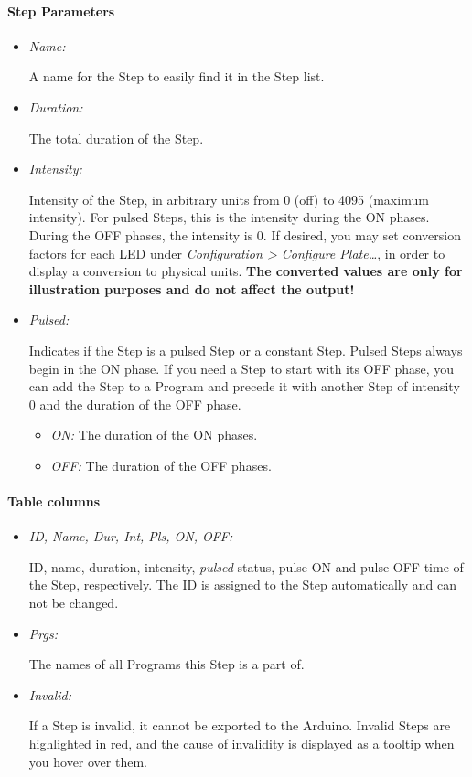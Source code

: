 \hypertarget{step-parameters}{%
\paragraph{Step Parameters}\label{step-parameters}}

\begin{itemize}
\item
  \emph{Name:}

  A name for the Step to easily find it in the Step list.
\item
  \emph{Duration:}

  The total duration of the Step.
\item
  \emph{Intensity:}

  Intensity of the Step, in arbitrary units from 0 (off) to 4095
  (maximum intensity). For pulsed Steps, this is the intensity during
  the ON phases. During the OFF phases, the intensity is 0. If desired,
  you may set conversion factors for each LED under \emph{Configuration
  \textgreater{} Configure Plate\ldots{}}, in order to display a
  conversion to physical units. \textbf{The converted values are only
  for illustration purposes and do not affect the output!}
\item
  \emph{Pulsed:}

  Indicates if the Step is a pulsed Step or a constant Step. Pulsed
  Steps always begin in the ON phase. If you need a Step to start with
  its OFF phase, you can add the Step to a Program and precede it with
  another Step of intensity 0 and the duration of the OFF phase.

  \begin{itemize}
  \item
    \emph{ON:} The duration of the ON phases.
  \item
    \emph{OFF:} The duration of the OFF phases.
  \end{itemize}
\end{itemize}

\hypertarget{table-columns}{%
\paragraph{Table columns}\label{table-columns}}

\begin{itemize}
\item
  \emph{ID, Name, Dur, Int, Pls, ON, OFF:}

  ID, name, duration, intensity, \emph{pulsed} status, pulse ON and
  pulse OFF time of the Step, respectively. The ID is assigned to the
  Step automatically and can not be changed.
\item
  \emph{Prgs:}

  The names of all Programs this Step is a part of.
\item
  \emph{Invalid:}

  If a Step is invalid, it cannot be exported to the Arduino. Invalid
  Steps are highlighted in red, and the cause of invalidity is displayed
  as a tooltip when you hover over them.
\end{itemize}

